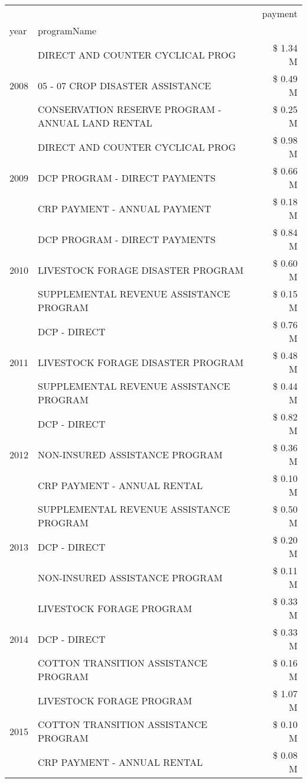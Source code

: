 \begin{tabular}{llr}
\toprule
 &  & payment \\
year & programName &  \\
\midrule
\multirow[t]{3}{*}{2008} & DIRECT AND COUNTER CYCLICAL PROG & \$ 1.34 M \\
 & 05 - 07 CROP DISASTER ASSISTANCE & \$ 0.49 M \\
 & CONSERVATION RESERVE PROGRAM - ANNUAL LAND RENTAL & \$ 0.25 M \\
\cline{1-3}
\multirow[t]{3}{*}{2009} & DIRECT AND COUNTER CYCLICAL PROG & \$ 0.98 M \\
 & DCP PROGRAM - DIRECT PAYMENTS & \$ 0.66 M \\
 & CRP PAYMENT - ANNUAL PAYMENT & \$ 0.18 M \\
\cline{1-3}
\multirow[t]{3}{*}{2010} & DCP PROGRAM - DIRECT PAYMENTS & \$ 0.84 M \\
 & LIVESTOCK FORAGE DISASTER  PROGRAM & \$ 0.60 M \\
 & SUPPLEMENTAL REVENUE ASSISTANCE PROGRAM & \$ 0.15 M \\
\cline{1-3}
\multirow[t]{3}{*}{2011} & DCP - DIRECT & \$ 0.76 M \\
 & LIVESTOCK FORAGE DISASTER PROGRAM & \$ 0.48 M \\
 & SUPPLEMENTAL REVENUE ASSISTANCE PROGRAM & \$ 0.44 M \\
\cline{1-3}
\multirow[t]{3}{*}{2012} & DCP - DIRECT & \$ 0.82 M \\
 & NON-INSURED ASSISTANCE PROGRAM & \$ 0.36 M \\
 & CRP PAYMENT - ANNUAL RENTAL & \$ 0.10 M \\
\cline{1-3}
\multirow[t]{3}{*}{2013} & SUPPLEMENTAL REVENUE ASSISTANCE PROGRAM & \$ 0.50 M \\
 & DCP - DIRECT & \$ 0.20 M \\
 & NON-INSURED ASSISTANCE PROGRAM & \$ 0.11 M \\
\cline{1-3}
\multirow[t]{3}{*}{2014} & LIVESTOCK FORAGE PROGRAM & \$ 0.33 M \\
 & DCP - DIRECT & \$ 0.33 M \\
 & COTTON TRANSITION ASSISTANCE PROGRAM & \$ 0.16 M \\
\cline{1-3}
\multirow[t]{3}{*}{2015} & LIVESTOCK FORAGE PROGRAM & \$ 1.07 M \\
 & COTTON TRANSITION ASSISTANCE PROGRAM & \$ 0.10 M \\
 & CRP PAYMENT - ANNUAL RENTAL & \$ 0.08 M \\
\cline{1-3}

\end{tabular}
